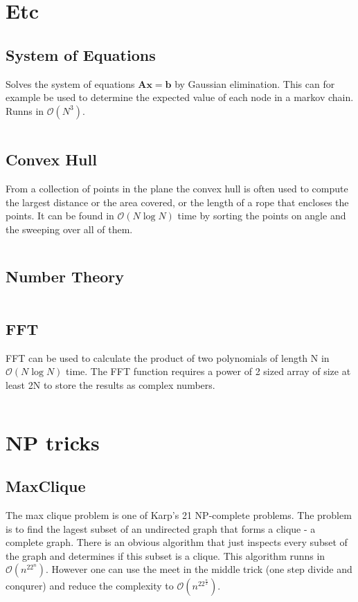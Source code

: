\documentclass[8pt,a4paper,landscape,oneside]{amsart}
\newcommand{\codej}[1]{\inputminted[fontsize=\large,tabsize=2,baselinestretch=1]{java}{code/#1}}
\newcommand{\codep}[1]{\inputminted[fontsize=\large,tabsize=2,baselinestretch=1]{py}{code/#1}}
\newcommand{\bigO}{\mathcal{O}}
\begin{document}
\begin{multicols*}{2}
\begin{large}
\section{Etc}
    \subsection{System of Equations}
        Solves the system of equations $\bm{A}\bm{x} = \bm{b}$ by Gaussian elimination. This can for example be used to determine the expected value of each node in a markov chain. Runns in $\bigO (N^3)$.
        \codep{Etc/gauss.py}
    \subsection{Convex Hull}
        From a collection of points in the plane the convex hull is often used to compute the largest distance or the area covered, or the length of a rope that encloses the points. It can be found in $\bigO (N\log{N})$ time by sorting the points on angle and the sweeping over all of them.
        \codep{Etc/convexhull.py}
    \subsection{Number Theory}
        \codep{Etc/numbertheory.py}
    \subsection{FFT}
        FFT can be used to calculate the product of two polynomials of length N in $\bigO(N\log N)$ time. The FFT function requires a power of 2 sized array of size at least 2N to store the results as complex numbers.
        \codep{Etc/fft.py}

\section{NP tricks}
    \subsection{MaxClique}
        The max clique problem is one of Karp's 21 NP-complete problems. The problem is to find the lagest subset of an undirected graph that forms a clique - a complete graph. There is an obvious algorithm that just inspects every subset of the graph and determines if this subset is a clique. This algorithm runns in $\bigO(n^22^n)$. However one can use the meet in the middle trick (one step divide and conqurer) and reduce the complexity to $\bigO(n^22^{\frac{n}{2}})$.
        \codej{NP/MaxClique.java}

\end{large}
\end{multicols*}
\end{document}
